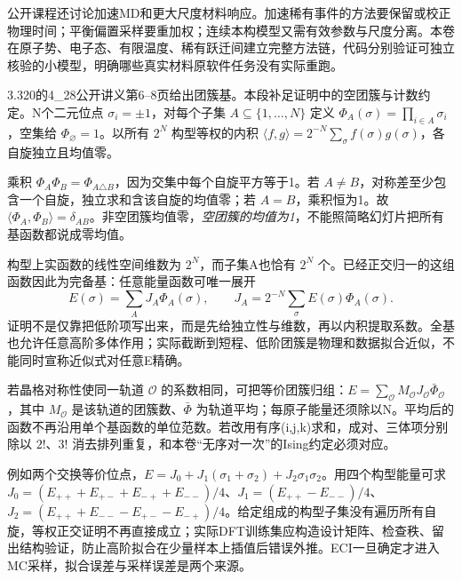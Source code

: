 公开课程还讨论加速MD和更大尺度材料响应。加速稀有事件的方法要保留或校正物理时间；平衡偏置采样要重加权；连续本构模型又需有效参数与尺度分离。本卷在原子势、电子态、有限温度、稀有跃迁间建立完整方法链，代码分别验证可独立核验的小模型，明确哪些真实材料原软件任务没有实际重跑。

3.320的4\_28公开讲义第6--8页给出团簇基。本段补足证明中的空团簇与计数约定。N个二元位点 $\sigma_i=\pm1$，对每个子集 $A\subseteq\{1,\ldots,N\}$ 定义 $\Phi_A(\sigma)=\prod_{i\in A}\sigma_i$，空集给 $\Phi_\varnothing=1$。以所有 $2^N$ 构型等权的内积 $\langle f,g\rangle=2^{-N}\sum_\sigma f(\sigma)g(\sigma)$，各自旋独立且均值零。

乘积 $\Phi_A\Phi_B=\Phi_{A\triangle B}$，因为交集中每个自旋平方等于1。若 $A\ne B$，对称差至少包含一个自旋，独立求和含该自旋的均值零；若 $A=B$，乘积恒为1。故 $\langle\Phi_A,\Phi_B\rangle=\delta_{AB}$。非空团簇均值零，\emph{空团簇的均值为1}，不能照简略幻灯片把所有基函数都说成零均值。

构型上实函数的线性空间维数为 $2^N$，而子集A也恰有 $2^N$ 个。已经正交归一的这组函数因此为完备基：任意能量函数可唯一展开
\[
 E(\sigma)=\sum_A J_A\Phi_A(\sigma),\qquad
 J_A=2^{-N}\sum_\sigma E(\sigma)\Phi_A(\sigma).
\]
证明不是仅靠把低阶项写出来，而是先给独立性与维数，再以内积提取系数。全基也允许任意高阶多体作用；实际截断到短程、低阶团簇是物理和数据拟合近似，不能同时宣称近似式对任意E精确。

若晶格对称性使同一轨道 $\mathcal O$ 的系数相同，可把等价团簇归组：$E=\sum_{\mathcal O}M_{\mathcal O}J_{\mathcal O}\bar\Phi_{\mathcal O}$，其中 $M_{\mathcal O}$ 是该轨道的团簇数、$\bar\Phi$ 为轨道平均；每原子能量还须除以N。平均后的函数不再沿用单个基函数的单位范数。若改用有序(i,j,k)求和，成对、三体项分别除以 $2!$、$3!$ 消去排列重复，和本卷“无序对一次”的Ising约定必须对应。

例如两个交换等价位点，$E=J_0+J_1(\sigma_1+\sigma_2)+J_2\sigma_1\sigma_2$。用四个构型能量可求 $J_0=(E_{++}+E_{+-}+E_{-+}+E_{--})/4$、$J_1=(E_{++}-E_{--})/4$、$J_2=(E_{++}+E_{--}-E_{+-}-E_{-+})/4$。给定组成的构型子集没有遍历所有自旋，等权正交证明不再直接成立；实际DFT训练集应构造设计矩阵、检查秩、留出结构验证，防止高阶拟合在少量样本上插值后错误外推。ECI一旦确定才进入MC采样，拟合误差与采样误差是两个来源。
